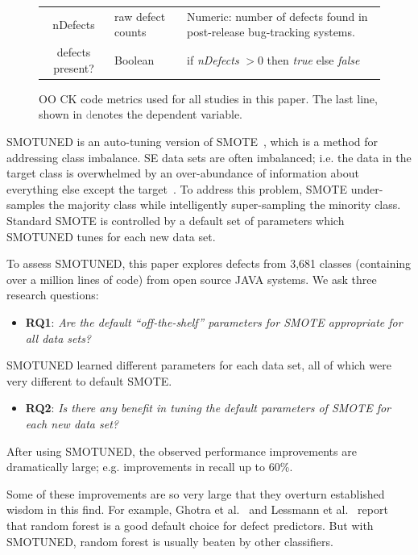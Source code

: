 \documentclass[10pt,conference]{IEEEtran}
\newcommand{\bi}{\begin{itemize}[leftmargin=0.4cm]}
\newcommand{\ei}{\end{itemize}}
\theoremstyle{break}
\theoremstyle{break}
\newcommand{\sma}{{\sc SMOTE}}
\newcommand{\smb}{{\sc SMOTUNED}}
\begin{document}
\begin{figure}[!t]
\begin{center}
{\begin{tabular}{c|l|p{4.0in}}
nDefects & raw defect counts & Numeric: number of defects found in post-release bug-tracking systems.\\
\rowcolor{lightgray}
defects present? & Boolean& if {\em nDefects} $>0$ then {\em true} else {\em false}
\end{tabular}
}
\end{center}
\caption{OO CK code metrics used for all studies in this paper.
The last line, shown in \textcolor{gray} denotes the dependent variable.}
\label{fig:ck}
\vspace{-0.7cm}
\end{figure}


SMOTUNED is an auto-tuning version of  SMOTE~\cite{chawla2002smote}, which is
a method for addressing class imbalance. SE data
sets are often imbalanced; i.e. the data in the target class is overwhelmed by an over-abundance of information about everything else except the target~\cite{menzies2007problems}. To
address this problem, {\sma} under-samples
the majority class while intelligently super-sampling  the minority class. Standard
{\sma} is controlled by a default
set of parameters which {\smb} tunes 
for each new data set. 

To assess SMOTUNED, this paper explores defects from  3,681	 classes (containing over a million lines of code) from open source JAVA systems. We ask three research questions: 
 \bi\item
  \textbf{RQ1}:  {\em Are the default ``off-the-shelf'' parameters for {\sma} appropriate for
  all data sets?} 
  \ei
 \begin{lesson}{\smb} learned different parameters for each data set, all of which  were very different to default SMOTE.
 \end{lesson}
  \bi
  \item
  \textbf{RQ2}: {\em   Is  there any benefit in tuning the default parameters of {\sma} for
  each new data set?} 
  \ei
   \begin{lesson}After using {\smb}, the observed performance improvements are dramatically large; e.g. improvements in recall  up to 60\%.
 \end{lesson}
Some of these improvements are so very large that they overturn established wisdom in this find.
For example,  Ghotra et al.~\cite{ghotra2015revisiting} and Lessmann et al.~\cite{lessmann2008benchmarking}
 report that   random forest is a  good default choice for  defect predictors.
But with  SMOTUNED, random forest is usually
beaten by other classifiers. 
\end{document}
